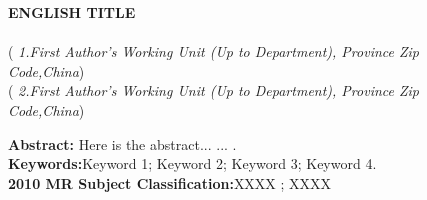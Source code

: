 \vspace{6mm}
\hspace{-8mm}
\parbox{\textwidth}{
\begin{center}
\large{\textbf{ENGLISH TITLE }}\\
\vspace{8mm}
\\[2pt]
(\textit{ 1.First Author's Working Unit (Up to Department), Province Zip ~ Code,China}) \\[2pt]
(\textit{ 2.First Author's Working Unit (Up to Department), Province Zip ~ Code,China}) \\[2pt]
\end{center}

\begin{center}
\begin{minipage}[c]{14cm}
 \hspace{2em}\textbf{Abstract:}
Here is the abstract... ... .\\
\mbox{}\hspace{2.3em}\textbf{Keywords:}\quad Keyword 1; Keyword 2; Keyword 3; Keyword 4.\\
\mbox{}\hspace{2.3em}\textbf{2010 MR  Subject Classification:}\quad XXXX ; XXXX\\

\end{minipage}
\end{center}}